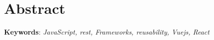 
\chapter{Abstract}

\lipsum[1] %

\noindent \textbf{Keywords}: \textit{JavaScript, \acrshort{rest}, Frameworks, reusability, Vuejs, React}
